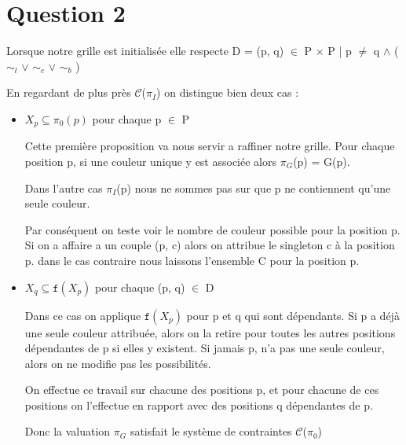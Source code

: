 
\section{Question 2}

Lorsque notre grille est initialis\'ee elle respecte D = {(p, q) $\in$ P $\times$ P | p $\neq$ q $\wedge$ ( $\sim_{l}$ $\vee$ $\sim_{c}$ $\vee$ $\sim_{b}$ )}

En regardant de plus pr\`es $\mathcal{C}$($\pi_I$) on distingue bien deux cas :

\bigskip
\begin{itemize}
\item $X_p \subseteq \pi_0(p)$ pour chaque p $\in$ P

Cette premi\`ere proposition va nous servir a raffiner notre grille. Pour chaque position p, si une couleur unique y est associ\'ee alors $\pi_G$(p) = {G(p)}.


Dans l'autre cas $\pi_I$(p)  nous ne sommes pas sur que p ne contiennent qu'une seule couleur.  

\bigskip
Par cons\'equent on teste voir le nombre de couleur possible pour la position p. Si on a affaire a un couple {(p, c)} alors on attribue le singleton {c} \`a la position p. dans le cas contraire nous laissons l'ensemble C pour la position p.

\bigskip
\item $X_q \subseteq \mathtt{f} (X_p)$ pour chaque (p, q) $\in$ D

Dans ce cas on applique $\mathtt{f} (X_p)$ pour p et q qui sont d\'ependants. Si p a d\'ej\`a une seule couleur attribu\'ee, alors on la retire pour toutes les autres positions d\'ependantes de p si elles y existent. Si jamais p, n'a pas une seule couleur, alors on ne modifie pas les possibilit\'es. 

\bigskip
On effectue ce travail sur chacune des positions p, et pour chacune de ces positions on l'effectue en rapport avec des positions q d\'ependantes de p.

Donc la valuation $\pi_G$ satisfait le syst\`eme de contraintes $\mathcal{C}$($\pi_0$)
\end{itemize}